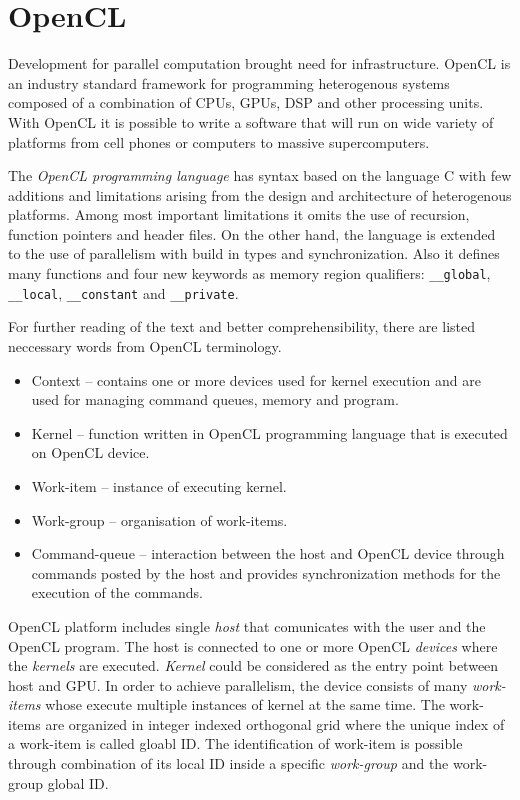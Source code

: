 \section{OpenCL}
Development for parallel computation brought need for infrastructure. OpenCL
is an industry standard framework for programming heterogenous systems 
composed of a combination of CPUs, GPUs, DSP and other processing 
units\cite{opencl}. With OpenCL it is possible to write a software that will
run on wide variety of platforms from cell phones or computers to massive
supercomputers. 

The \textit{OpenCL programming language} has syntax based
on the language C with few additions and limitations arising from the design
and architecture of heterogenous platforms. Among most important limitations
it omits the use of recursion, function pointers and header files. On the 
other hand, the language is extended to the use of parallelism with build 
in types and synchronization. Also it defines many functions and four new
keywords as memory region qualifiers: \texttt{\_\_global}, 
\texttt{\_\_local}, \texttt{\_\_constant} and \texttt{\_\_private}.

For further reading of the text and better comprehensibility, there are
listed neccessary words from OpenCL terminology\cite{opencl}.
\begin{itemize}
\item Context -- contains one or more devices used for kernel execution
and are used for managing command queues, memory and program.
\item Kernel -- function written in OpenCL programming language that 
is executed on OpenCL device. 
\item Work-item -- instance of executing kernel. 
\item Work-group -- organisation of work-items. 
\item Command-queue -- interaction between the host and OpenCL
device through commands posted by the host and provides synchronization
methods for the execution of the commands.
\end{itemize}

OpenCL platform includes single \textit{host} that comunicates with the user
and the OpenCL program. The host is connected to one or more
OpenCL \textit{devices} where the \textit{kernels} are executed. 
\textit{Kernel} could be considered as the entry point between host and
GPU. In order to achieve parallelism, the device consists of many 
\textit{work-items} whose execute multiple instances of kernel at the same 
time. The work-items are organized in integer indexed orthogonal grid where 
the unique index of a work-item is called gloabl ID. The identification
of work-item is possible through combination of its local ID inside a specific
\textit{work-group} and the work-group global ID.

